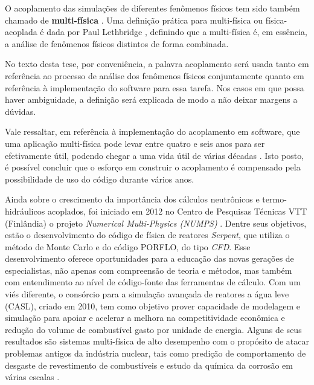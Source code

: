 O acoplamento das simulações de diferentes fenômenos físicos tem sido também chamado de
\textbf{multi-física} \cite{Leppanen2012}. 
Uma definição prática para multi-física ou física-acoplada é dada por Paul Lethbridge \cite{Lethbridge2005}, definindo que 
a multi-física é, em essência, a análise de fenômenos físicos distintos de forma combinada.

No texto desta tese, 
por conveniência, a palavra acoplamento será usada tanto em referência ao processo de análise dos fenômenos físicos conjuntamente 
quanto em referência à implementação do software para essa tarefa. Nos casos em que possa haver ambiguidade, 
a definição será explicada de modo a não deixar margens a dúvidas.

Vale ressaltar, em referência à implementação do acoplamento em software, que uma aplicação multi-física 
pode levar entre quatro e seis anos para ser efetivamente útil, podendo chegar a uma vida útil de várias décadas 
\cite{Graham2004}. Isto posto, é possível concluir que o esforço em construir o acoplamento é compensado 
pela possibilidade de uso do código durante vários anos.

Ainda sobre o crescimento da importância dos cálculos neutrônicos e termo-hidráulicos acoplados, foi iniciado em 2012
no Centro de Pesquisas Técnicas VTT (Finlândia) o projeto \textit{Numerical Multi-Physics (NUMPS)} \cite{Leppanen2015}.
Dentre seus objetivos, estão o desenvolvimento do código de física de reatores \textit{Serpent}, que utiliza o método de
Monte Carlo e do código PORFLO, do tipo \textit{CFD}. Esse desenvolvimento oferece oportunidades para a educação das novas
gerações de especialistas, não apenas com compreensão de teoria e métodos, mas também com entendimento ao nível de
código-fonte das ferramentas de cálculo. Com um viés diferente, o consórcio para a simulação avançada de reatores
a água leve (CASL), criado em 2010, tem como objetivo prover capacidade de modelagem e simulação para apoiar e acelerar
a melhora na competitividade econômica e redução do volume de combustível gasto por unidade de energia. Alguns de seus
resultados são sistemas multi-física de alto desempenho com o propósito de atacar problemas antigos da indústria nuclear,
tais como predição de comportamento de desgaste de revestimento de combustíveis e estudo da química da corrosão em várias
escalas \cite{Turinsky2016}.


